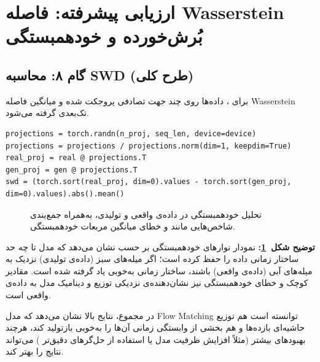\section{ارزیابی پیشرفته: فاصله Wasserstein بُرش‌خورده و خودهمبستگی}

\subsection{گام ۸: محاسبه SWD (طرح کلی)}
برای ، داده‌ها روی چند جهت تصادفی پروجکت شده و میانگین فاصله Wasserstein تک‌بعدی گرفته می‌شود.
\begin{verbatim}
projections = torch.randn(n_proj, seq_len, device=device)
projections = projections / projections.norm(dim=1, keepdim=True)
real_proj = real @ projections.T
gen_proj = gen @ projections.T
swd = (torch.sort(real_proj, dim=0).values - torch.sort(gen_proj, dim=0).values).abs().mean()
\end{verbatim}

\begin{figure}[H]
	\centering
	\caption{تحلیل خودهمبستگی در داده‌ی واقعی و تولیدی، به‌همراه جمع‌بندی شاخص‌هایی مانند  و خطای میانگین مربعات خودهمبستگی.}
	\label{fig:fm-autocorr}
\end{figure}

\noindent\textbf{توضیح شکل~\ref{fig:fm-autocorr}:}
نمودار نوارهای خودهمبستگی بر حسب  نشان می‌دهد که مدل تا چه حد ساختار زمانی داده را حفظ کرده است؛ اگر میله‌های سبز (داده‌ی تولیدی) نزدیک به میله‌های آبی (داده‌ی واقعی) باشند، ساختار زمانی به‌خوبی یاد گرفته شده است. مقادیر کوچک  و خطای خودهمبستگی نیز نشان‌دهنده‌ی نزدیکی توزیع و دینامیک مدل به داده‌ی واقعی است.

در مجموع، نتایج بالا نشان می‌دهد که مدل Flow Matching توانسته است هم توزیع حاشیه‌ای بازده‌ها و هم بخشی از وابستگی زمانی آن‌ها را به‌خوبی بازتولید کند، هرچند بهبودهای بیشتر (مثلاً افزایش ظرفیت مدل یا استفاده از حل‌گرهای دقیق‌تر ) می‌تواند نتایج را بهتر کند.